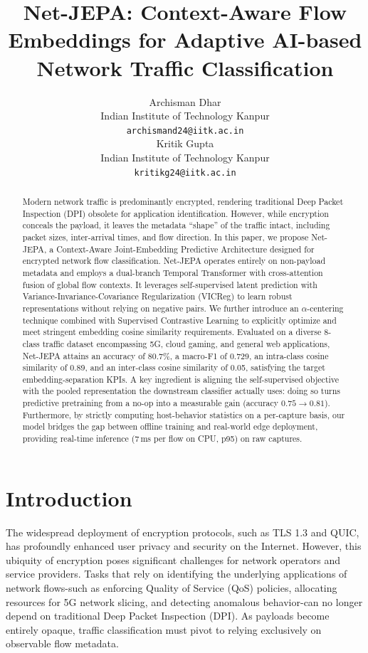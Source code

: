 \documentclass{article}
\title{Net-JEPA: Context-Aware Flow Embeddings for Adaptive AI-based Network Traffic Classification}
\author{%
  Archisman Dhar \\
  Indian Institute of Technology Kanpur \\
  \texttt{archismand24@iitk.ac.in} \\
  \And
  Kritik Gupta \\
  Indian Institute of Technology Kanpur \\
  \texttt{kritikg24@iitk.ac.in} \\
}
\begin{document}
\maketitle

\begin{abstract}
Modern network traffic is predominantly encrypted, rendering traditional Deep Packet Inspection (DPI) obsolete for application identification. However, while encryption conceals the payload, it leaves the metadata ``shape'' of the traffic intact, including packet sizes, inter-arrival times, and flow direction. In this paper, we propose Net-JEPA, a Context-Aware Joint-Embedding Predictive Architecture designed for encrypted network flow classification. Net-JEPA operates entirely on non-payload metadata and employs a dual-branch Temporal Transformer with cross-attention fusion of global flow contexts. It leverages self-supervised latent prediction with Variance-Invariance-Covariance Regularization (VICReg) to learn robust representations without relying on negative pairs. We further introduce an $\alpha$-centering technique combined with Supervised Contrastive Learning to explicitly optimize and meet stringent embedding cosine similarity requirements. Evaluated on a diverse 8-class traffic dataset encompassing 5G, cloud gaming, and general web applications, Net-JEPA attains an accuracy of 80.7\%, a macro-F1 of 0.729, an intra-class cosine similarity of 0.89, and an inter-class cosine similarity of 0.05, satisfying the target embedding-separation KPIs. A key ingredient is aligning the self-supervised objective with the pooled representation the downstream classifier actually uses: doing so turns predictive pretraining from a no-op into a measurable gain (accuracy $0.75 \rightarrow 0.81$). Furthermore, by strictly computing host-behavior statistics on a per-capture basis, our model bridges the gap between offline training and real-world edge deployment, providing real-time inference (7\,ms per flow on CPU, p95) on raw captures.
\end{abstract}

\section{Introduction}

The widespread deployment of encryption protocols, such as TLS 1.3 and QUIC, has profoundly enhanced user privacy and security on the Internet. However, this ubiquity of encryption poses significant challenges for network operators and service providers. Tasks that rely on identifying the underlying applications of network flows-such as enforcing Quality of Service (QoS) policies, allocating resources for 5G network slicing, and detecting anomalous behavior-can no longer depend on traditional Deep Packet Inspection (DPI). As payloads become entirely opaque, traffic classification must pivot to relying exclusively on observable flow metadata.
\end{document}
